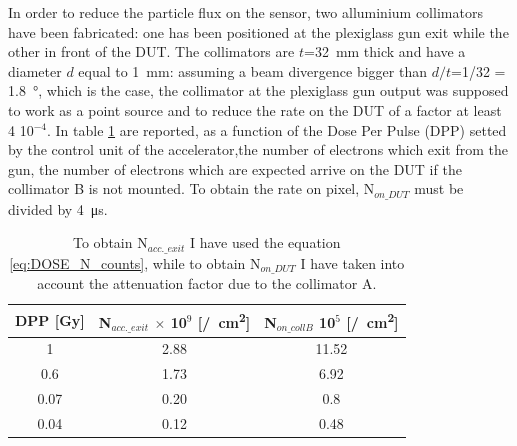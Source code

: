       In order to reduce the particle flux on the sensor, two alluminium collimators have been fabricated: one has been positioned at the plexiglass gun exit while the other in front of the DUT. The collimators are $t$=\SI{32}{mm} thick and have a diameter $d$ equal to \SI{1}{mm}: assuming a beam divergence bigger than $d/t$=1/32 = \SI{1.8}{\degree}, which is the case, the collimator at the plexiglass gun output was supposed to work as a point source and to reduce the rate on the DUT of a factor at least 4 10${^{-4}}$. In table \ref{tab:Dose_N} are reported, as a function of the Dose Per Pulse (DPP) setted by the control unit of the accelerator,the number of electrons which exit from the gun, the number of electrons which are expected arrive on the DUT if the collimator B is not mounted. 
      To obtain the rate on pixel, N$_{on\_DUT}$ must be divided by \SI{4}{\us}.

      \begin{table}
         \begin{center}
         \begin{tabular}{ c |c | c}
         DPP [\si{Gy}] & N$_{acc.\_exit}$ $\times$ 10$^{9}$ [\si{/cm\squared}] & N$_{on\_collB}$ 10$^{5}$ [\si{/cm\squared}]\\
         \hline
         1 & 2.88 & 11.52 \\ 
         0.6 & 1.73 & 6.92 \\
         0.07 & 0.20 & 0.8\\
         0.04 & 0.12 & 0.48\\
         \end{tabular}
         \caption{To obtain N$_{acc.\_exit}$ I have used the equation \ref{eq:DOSE_N_counts}, while to obtain N$_{on\_DUT}$ I have taken into account the attenuation factor due to the collimator A.}
         \label{tab:Dose_N}
         \end{center}
     \end{table}
      
      
      
